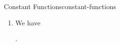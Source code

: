 \begin{example}{Constant Functions}{constant-functions}
\begin{enumerate}
\begin{webprooftree}
\begin{prooftree}
                \end{prooftree}%
                .%
            \end{webprooftree}%
        \item\label{constant-functions-precomposition-with-the-constant-function}We have
            \begin{webprooftree}%
                \begin{prooftree}%
                \end{prooftree}%
                .%
            \end{webprooftree}%
    \end{enumerate}
\end{example}
